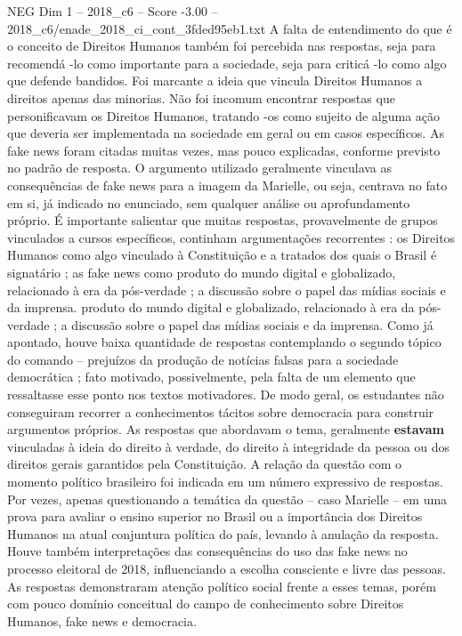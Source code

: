 \begin{textsample}{NEG Dim 1 – 2018\_c6 – Score -3.00 – 2018\_c6/enade\_2018\_ci\_cont\_3fded95eb1.txt}
A falta de entendimento do que é o conceito de Direitos Humanos também foi percebida nas respostas, seja para recomendá -lo como importante para a sociedade, seja para criticá -lo como algo que defende bandidos.
Foi marcante a ideia que vincula Direitos Humanos a direitos apenas das minorias.
Não foi incomum encontrar respostas que personificavam os Direitos Humanos, tratando -os como sujeito de alguma ação que deveria ser implementada na sociedade em geral ou em casos específicos.
As fake news foram citadas muitas vezes, mas pouco explicadas, conforme previsto no padrão de resposta.
O argumento utilizado geralmente vinculava as consequências de fake news para a imagem da Marielle, ou seja, centrava no fato em si, já indicado no enunciado, sem qualquer análise ou aprofundamento próprio.
É importante salientar que muitas respostas, provavelmente de grupos vinculados a cursos específicos, continham argumentações recorrentes : os Direitos Humanos como algo vinculado à Constituição e a tratados dos quais o Brasil é signatário ; as fake news como produto do mundo digital e globalizado, relacionado à era da pós-verdade ; a discussão sobre o papel das mídias sociais e da imprensa. produto do mundo digital e globalizado, relacionado à era da pós-verdade ; a discussão sobre o papel das mídias sociais e da imprensa.
Como já apontado, houve baixa quantidade de respostas contemplando o segundo tópico do comando – prejuízos da produção de notícias falsas para a sociedade democrática ; fato motivado, possivelmente, pela falta de um elemento que ressaltasse esse ponto nos textos motivadores.
De modo geral, os estudantes não conseguiram recorrer a conhecimentos tácitos sobre democracia para construir argumentos próprios.
As respostas que abordavam o tema, geralmente \textbf{estavam} vinculadas à ideia do direito à verdade, do direito à integridade da pessoa ou dos direitos gerais garantidos pela Constituição.
A relação da questão com o momento político brasileiro foi indicada em um número expressivo de respostas.
Por vezes, apenas questionando a temática da questão – caso Marielle – em uma prova para avaliar o ensino superior no Brasil ou a importância dos Direitos Humanos na atual conjuntura política do país, levando à anulação da resposta.
Houve também interpretações das consequências do uso das fake news no processo eleitoral de 2018, influenciando a escolha consciente e livre das pessoas.
As respostas demonstraram atenção político social frente a esses temas, porém com pouco domínio conceitual do campo de conhecimento sobre Direitos Humanos, fake news e democracia.

\end{textsample}
